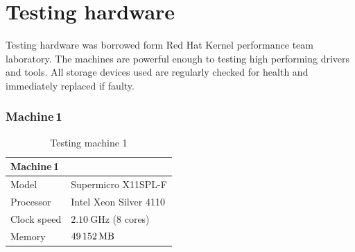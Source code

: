 \documentclass[
  color, %
  table, %
  lof,   %
  lot,   %
]{fithesis3}
\begin{document}




\printbibliography[heading=bibintoc]


\appendix
\chapter{Testing hardware}
\label{hardware}
Testing hardware was borrowed form Red Hat Kernel performance team laboratory. The machines are powerful enough to testing high performing drivers and tools. All storage devices used are regularly checked for health and immediately replaced if faulty.


\subsection{Machine\,1}
\label{hw:1}
\begin{table}
\centering
\begin{tabular}{|l|l|}
\hline
   \multicolumn{2}{|l|}{Machine\,1} \\ \hline %
    Model & Supermicro X11SPL-F\\
    \hline
    Processor & Intel Xeon Silver 4110  \\
    \hline
    Clock speed & $\SI{2.10}{\giga\hertz}$ (8 cores) \\
    \hline
    Memory & $\SI{49152}{\mega\byte}$ \\
    \hline
\end{tabular}
\caption{Testing machine 1}
\end{table}
\end{document}
